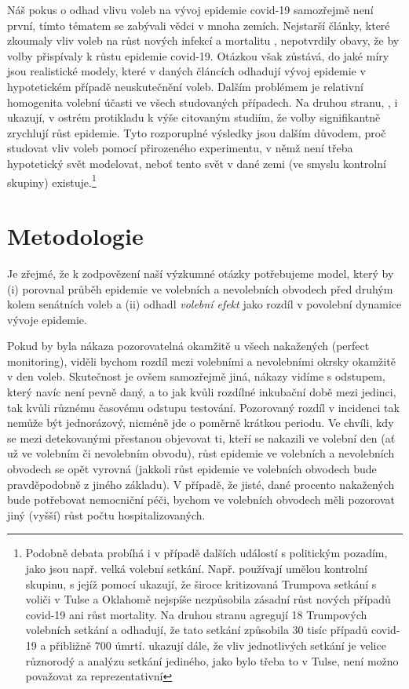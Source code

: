 Náš pokus o odhad vlivu voleb na vývoj epidemie covid-19 samozřejmě není první, tímto tématem se zabývali vědci v mnoha zemích. Nejstarší články, které zkoumaly vliv voleb na růst nových infekcí a mortalitu \cite{Berry2020, feltham2020no, AJPH2020}, nepotvrdily obavy, že by volby přispívaly k růstu epidemie covid-19. Otázkou však zůstává, do jaké míry jsou realistické modely, které v daných článcích odhadují vývoj epidemie v hypotetickém případě neuskutečnění voleb. Dalším problémem je relativní homogenita volební účasti ve všech studovaných případech. Na druhou stranu, 
\cite{bertoli_france}, \cite{cotti2020relationship} i \cite{Cassan2020} 
ukazují, v ostrém protikladu k výše citovaným studiím, že volby signifikantně zrychlují růst epidemie. Tyto rozporuplné výsledky jsou dalším důvodem, proč studovat vliv voleb pomocí přirozeného experimentu, v němž není třeba hypotetický svět  modelovat, neboť tento svět v dané zemi (ve smyslu kontrolní skupiny) existuje.\footnote{Podobně debata probíhá i v případě dalších událostí s politickým pozadím, jako jsou např. velká volební setkání. Např. \cite{dave2020risk} používají umělou kontrolní skupinu, s jejíž pomocí ukazují, že široce kritizovaná Trumpova setkání s voliči v Tulse a Oklahomě nejspíše nezpůsobila zásadní růst nových případů covid-19 ani růst mortality. Na druhou stranu  \cite{bernheim2020effects} agregují 18 Trumpových volebních setkání a odhadují, že tato setkání způsobila 30 tisíc případů covid-19 a přibližně 700 úmrtí.  \cite{bernheim2020effects} ukazují dále, že vliv jednotlivých setkání je velice různorodý a analýzu setkání jediného, jako bylo třeba to v Tulse, není možno považovat za reprezentativní}


\section*{Metodologie}
Je zřejmé, že k zodpovězení naší výzkumné otázky potřebujeme model, který by (i) porovnal průběh epidemie ve volebních a nevolebních obvodech před druhým kolem senátních voleb a (ii) odhadl {\it volební efekt} jako rozdíl v povolební dynamice vývoje epidemie.

Pokud by byla nákaza pozorovatelná okamžitě u všech nakažených (perfect monitoring), viděli bychom rozdíl mezi volebními a nevolebními okrsky okamžitě v den voleb. Skutečnost je ovšem samozřejmě jiná, nákazy vidíme s odstupem, který navíc není pevně daný, a to jak kvůli rozdílné inkubační době mezi jedinci, tak kvůli různému časovému odstupu testování. Pozorovaný rozdíl v incidenci tak nemůže být jednorázový, nicméně jde o poměrně krátkou periodu. Ve chvíli, kdy se mezi detekovanými přestanou objevovat ti, kteří se nakazili ve volební den (ať už ve volebním či nevolebním obvodu), růst epidemie ve volebních a nevolebních obvodech se opět vyrovná (jakkoli růst epidemie ve volebních obvodech bude pravděpodobně z jiného základu). V případě, že jisté, dané procento nakažených bude potřebovat nemocniční péči, bychom ve volebních obvodech měli pozorovat jiný (vyšší) růst počtu hospitalizovaných.  

